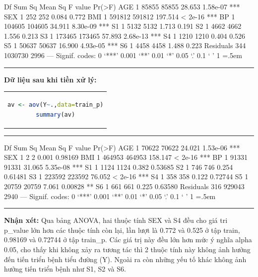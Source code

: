 \documentclass[runningheads]{llncs}
\newenvironment{lcverbatim}
 {\SaveVerbatim{cverb}}
 {\endSaveVerbatim
  \flushleft\fboxrule=0pt\fboxsep=.5em
  \colorbox{cverbbg}{%
    \makebox[\dimexpr\linewidth-2\fboxsep][l]{\BUseVerbatim{cverb}}%
  }
  \endflushleft
}
\begin{document}
\begin{lcverbatim}
          Df  Sum Sq Mean Sq F value   Pr(>F)    
AGE           1   85855   85855  28.653 1.58e-07 ***
SEX           1     252     252   0.084    0.772    
BMI           1  591812  591812 197.514  < 2e-16 ***
BP            1  104605  104605  34.911 8.30e-09 ***
S1            1    5132    5132   1.713    0.191    
S2            1    4662    4662   1.556    0.213    
S3            1  173465  173465  57.893 2.68e-13 ***
S4            1    1210    1210   0.404    0.526    
S5            1   50637   50637  16.900 4.93e-05 ***
S6            1    4458    4458   1.488    0.223    
Residuals   344 1030730    2996                     
---
Signif. codes:  0 ‘***’ 0.001 ‘**’ 0.01 ‘*’ 0.05 ‘.’ 0.1 ‘ ’ 1
\end{lcverbatim}


\hrule
\vspace{0.5cm}

\textbf{Dữ liệu sau khi tiền xử lý:}
\begin{center}
\begin{tabular}{c}
\begin{lstlisting}[language=R]
av <- aov(Y~.,data=train_p)
summary(av)
\end{lstlisting}
\end{tabular}
\end{center}
\hrule
\begin{lcverbatim}
             Df Sum Sq Mean Sq F value   Pr(>F)    
AGE           1  70622   70622  24.021 1.53e-06 ***
SEX           1      2       2   0.001  0.98169    
BMI           1 464953  464953 158.147  < 2e-16 ***
BP            1  91331   91331  31.065 5.35e-08 ***
S1            1   1124    1124   0.382  0.53685    
S2            1    746     746   0.254  0.61481    
S3            1 223592  223592  76.052  < 2e-16 ***
S4            1    358     358   0.122  0.72744    
S5            1  20759   20759   7.061  0.00828 ** 
S6            1    661     661   0.225  0.63580    
Residuals   316 929043    2940                     
---
Signif. codes:  0 ‘***’ 0.001 ‘**’ 0.01 ‘*’ 0.05 ‘.’ 0.1 ‘ ’ 1
\end{lcverbatim}
\hrule
\vspace{0.5cm}

\textbf{Nhận xét:}
Qua bảng ANOVA, hai thuộc tính SEX và S4 đều cho giá tri p\_value lớn hơn các thuộc tính còn lại, lần lượt là 0.772 và 0.525 ở tập train, 0.98169 và 0.72744 ở tập train\_p. Các giá trị này đều lớn hơn mức ý nghĩa alpha 0.05, cho thấy khi không xảy ra tương tác thì 2 thuộc tính này không ảnh hưởng đến tiến triển bệnh tiểu đường (Y). Ngoài ra còn những yếu tố khác không ảnh hưởng tiến triển bệnh như S1, S2 và S6.
\end{document}

